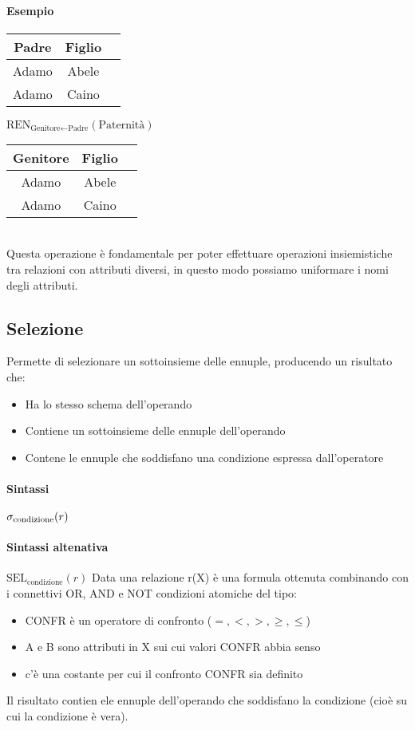 \paragraph*{Esempio}
\begin{tabular}{|c|c|c|}
    \hline
    \textbf{Padre} & \textbf{Figlio} \\
    \hline
    Adamo          & Abele           \\
    \hline
    Adamo          & Caino           \\
    \hline
\end{tabular}
$\text{REN}_{\text{Genitore}\leftarrow\text{Padre}}(\text{Paternità})$
\begin{tabular}{|c|c|c|}
    \hline
    \textbf{Genitore} & \textbf{Figlio} \\
    \hline
    Adamo          & Abele           \\
    \hline
    Adamo          & Caino           \\
    \hline
\end{tabular}\\
Questa operazione è fondamentale per poter effettuare operazioni insiemistiche tra
relazioni con attributi diversi, in questo modo possiamo uniformare i nomi degli attributi.
\subsection{Selezione}
Permette di selezionare un sottoinsieme delle ennuple, producendo un risultato che:
\begin{itemize}
    \item Ha lo stesso schema dell'operando
    \item Contiene un sottoinsieme delle ennuple dell'operando
    \item Contene le ennuple che soddisfano una condizione espressa dall'operatore
\end{itemize}
\paragraph*{Sintassi} $\sigma_{\text{condizione}}(r) \\$
\paragraph*{Sintassi altenativa}$\text{SEL}_{\text{condizione}}(r)$
Data una relazione r(X) è una formula ottenuta combinando con i connettivi OR, AND e NOT
condizioni atomiche del tipo:
\begin{itemize}
    \item CONFR è un operatore di confronto ($=, <, >, \geq, \leq$)
    \item A e B sono attributi in X sui cui valori CONFR abbia senso
    \item c'è una costante per cui il confronto CONFR sia definito
\end{itemize}
Il risultato contien ele ennuple dell'operando che soddisfano la condizione (cioè su cui
la condizione è vera).
